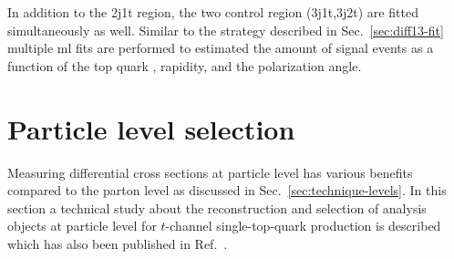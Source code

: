 
In addition to the 2j1t region, the two \ttbar control region (3j1t,3j2t) are fitted simultaneously as well. Similar to the strategy described in Sec.~\ref{sec:diff13-fit} multiple \gls{ml} fits are performed to estimated the amount of signal events as a function of the top quark \pt, rapidity, and the polarization angle.

 

\section{Particle level selection}
\label{sec:prospects-fiducial-studies}

Measuring differential cross sections at particle level has various benefits compared to the parton level as discussed in Sec.~\ref{sec:technique-levels}. In this section a technical study about the reconstruction and selection of analysis objects at particle level for $t$-channel single-top-quark production is described which has also been published in Ref.~\cite{particleStudies}.

